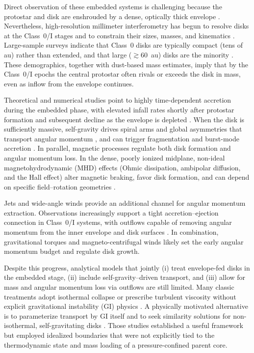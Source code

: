 \documentclass[twocolumn,linenumbers]{aastex631}
\begin{document}
Direct observation of these embedded systems is challenging because the protostar and disk are enshrouded by a dense, optically thick envelope \citep{andre1993submillimeter}. Nevertheless, high-resolution millimeter interferometry has begun to resolve disks at the Class~0/I stages and to constrain their sizes, masses, and kinematics \citep{enoch2011disk,tobin20120,hara2013rotating,murillo2013keplerian,codella2014alma,lindberg2014alma, ohashi2013, ohashi2023early, aso2015alma, aso2019protostellar, maret2020searching}. Large-sample surveys indicate that Class~0 disks are typically compact (tens of au) rather than extended, and that large ($\gtrsim 60$~au) disks are the minority \citep{segura2018vla,maury2019characterizing,tobin2020vandam,ohashi2023early,hsieh2024alma}. These demographics, together with dust-based mass estimates, imply that by the Class~0/I epochs the central protostar often rivals or exceeds the disk in mass, even as inflow from the envelope continues.

Theoretical and numerical studies point to highly time-dependent accretion during the embedded phase, with elevated infall rates shortly after protostar formation and subsequent decline as the envelope is depleted \citep{masunaga2000radiation,schmeja2004protostellar,dib2010imf}. When the disk is sufficiently massive, self-gravity drives spiral arms and global asymmetries that transport angular momentum \citep{lin1987grav}, and can trigger fragmentation and burst-mode accretion \citep{vorobyov2005origin, vorobyov2006burst, vorobyov2010formation}. In parallel, magnetic processes regulate both disk formation and angular momentum loss. In the dense, poorly ionized midplane, non-ideal magnetohydrodynamic (MHD) effects (Ohmic dissipation, ambipolar diffusion, and the Hall effect) alter magnetic braking, favor disk formation, and can depend on specific field–rotation geometries \citep{machida2011effect,tsukamoto2015effects,masson2016ad,wurster2020dominant,basu2024pd}. 

Jets and wide-angle winds provide an additional channel for angular momentum extraction. Observations increasingly support a tight accretion–ejection connection in Class~0/I systems, with outflows capable of removing angular momentum from the inner envelope and disk surfaces \citep{pudritz2019outflows,gaudel2020angmom}. In combination, gravitational torques and magneto-centrifugal winds likely set the early angular momentum budget and regulate disk growth.

Despite this progress, analytical models that jointly (i) treat envelope-fed disks in the embedded stage, (ii) include self-gravity–driven transport, and (iii) allow for mass and angular momentum loss via outflows are still limited. Many classic treatments adopt isothermal collapse or prescribe turbulent viscosity without explicit gravitational instability (GI) physics \citep{TerebeyShuCassen1984,basu1997}. A physically motivated alternative is to parameterize transport by GI itself and to seek similarity solutions for non-isothermal, self-gravitating disks \citep{abbassi2006selfsimilar,abbassi2013viscous}. Those studies established a useful framework but employed idealized boundaries that were not explicitly tied to the thermodynamic state and mass loading of a pressure-confined parent core.
\end{document}
